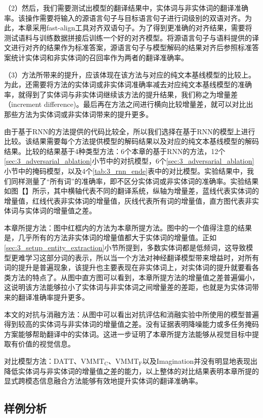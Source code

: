 （2）然后，我们需要测试出模型的翻译结果中，实体词与非实体词的翻译准确率。该操作需要将输入的源语言句子与目标语言句子进行词级别的双语对齐。为此，本章采用fast-align\cite{45_dyer-etal-2013-simple}工具对齐双语句子。为了得到更准确的对齐结果，需要将测试语料与训练数据拼接后训练一个好的对齐模型。将源语言句子与语料提供的译文进行对齐的结果作为标准答案，源语言句子与模型解码的结果对齐后参照标准答案统计实体词和非实体词的召回率作为两者的翻译准确率。

（3）方法所带来的提升，应该体现在该方法与对应的纯文本基线模型的比较上。为此，还需要将方法的实体词或非实体词准确率减去对应纯文本基线模型的准确率，就得到了实体词与非实体词继续该方法的提升结果，我们称之为增量差（increment difference)。最后再在方法之间进行横向比较增量差，就可以对比出那些方法为实体词或非实体词带来的提升更多。

由于基于RNN的方法提供的代码比较全，所以我们选择在基于RNN的模型上进行比较。该结果需要每个方法提供模型的解码结果以及对应的纯文本基线模型的解码结果。比较的结果基于4种类型方法：6个本章的基于RNN的方法，12个\ref{sec:3_adversarial_ablation}小节中的对抗模型，6个\ref{sec:3_adversarial_ablation}小节中的掩码模型，以及4个\ref{tab:3_rnn_ende}表中的对比模型。实验结果中，我们同样测量了“所有词”的准确率，即不区分实体词或非实体词的准确率。实验结果如图【】所示，其中横轴代表不同的翻译系统，纵轴为增量差，蓝线代表实体词的增量值，红线代表非实体词的增量值，灰线代表所有词的增量值，直方图代表非实体词与实体词的增量值之差。

{\sffamily 本章所提方法：}图中红框内的方法为本章所提方法。图中的一个值得注意的结果是，几乎所有的方法非实体词的增量值都大于实体词的增量值。正如\ref{sec:3_setup_entity_extraction}小节所提到，多数实体词都是低频词，这导致模型更难学习这部分词的表示，所以当一个方法对神经翻译模型带来增益时，对所有词的提升是普遍现象，该提升也主要表现在非实体词上，对实体词的提升就要看各类方法的特点了。从图中直方图可以看到，本章所提方法的增量值之差普遍偏小，这说明该方法能够拉小了实体词与非实体词之间增量差的差距，也就是为实体词带来的翻译准确率提升更多。

{\sffamily 本文的对抗与消融方法：}从图中可以看出对抗评估和消融实验中所使用的模型普遍得到较高的实体词与非实体词的增量值之差。没有证据表明降噪能力或多任务掩码方案能够帮助翻译中的实体词。这进一步证明了本章所提方法能够从视觉目标中提取有价值的视觉信息。

{\sffamily 对比模型方法：}DATT、$ \mathrm{VMMT_C} $、$ \mathrm{VMMT_F} $以及Imagination并没有明显地表现出降低实体词与非实体词的增量值之差的能力，以上整体的对比结果表明本章所提的显式跨模态信息融合方法能够有效地提升实体词的翻译准确率。

\subsection{样例分析}